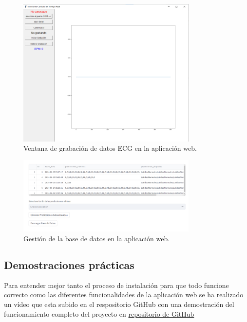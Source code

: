 \begin{figure}[h]
    \centering
    \includegraphics[width=0.8\textwidth]{img/ventana_tinker.png}
    \caption{Ventana de grabación de datos ECG en la aplicación web.}
    \label{fig:tkinter}
\end{figure}

\begin{figure}[h]
    \centering
    \includegraphics[width=0.8\textwidth]{img/bbdd.png}
    \caption{Gestión de la base de datos en la aplicación web.}
    \label{fig:database_management}
\end{figure}

\subsection{Demostraciones prácticas}

Para entender mejor tanto el proceso de instalación para que todo funcione correcto como las diferentes funcionalidades de la aplicación web se ha realizado un vídeo que esta subido en el respositorio GitHub con una demostración del funcionamiento completo del proyecto en \href{https://github.com/diegotrascasa/TFG}{repositorio de GitHub}

